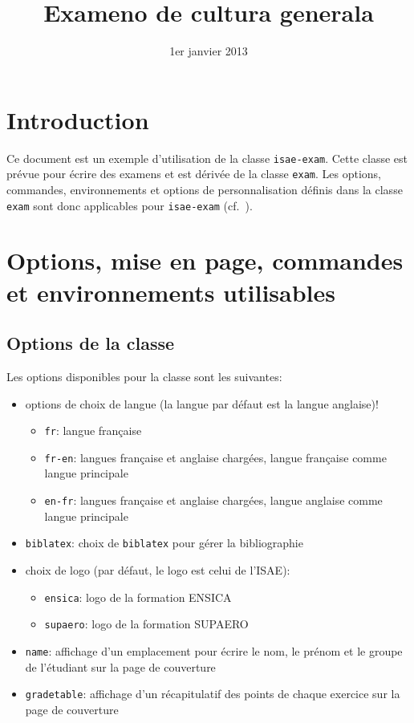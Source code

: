\documentclass[addpoints,fr,biblatex,name,gradetable,marksdetail,markssum]{isae-exam}
\title[Ex. de cultura generala]{Exameno de cultura generala}
\date{1er janvier 2013}
\begin{document}
\begin{coverpages}
  \basiccoverpage{}
\end{coverpages}

\section{Introduction}
\label{sec:introduction}

Ce document est un exemple d'utilisation de la classe
\texttt{isae-exam}. Cette classe est prévue pour écrire des examens et
est dérivée de la classe \texttt{exam}. Les options, commandes,
environnements et options de personnalisation définis dans la classe
\texttt{exam} sont donc applicables pour \texttt{isae-exam}
(cf.~\cite{hirschorn11:_exam}).

\section{Options, mise en page, commandes et environnements
  utilisables}
\label{sec:options-etc}

\subsection{Options de la classe}
\label{sec:options}

Les options disponibles pour la classe sont les suivantes:

\begin{itemize}
\item options de choix de langue (la langue par défaut est la langue
  anglaise)!
  \begin{itemize}
  \item \lstinline!fr!: langue française
  \item \lstinline!fr-en!: langues française et anglaise chargées,
    langue française comme langue principale
  \item \lstinline!en-fr!: langues française et anglaise chargées,
    langue anglaise comme langue principale
  \end{itemize}
\item \lstinline!biblatex!: choix de \texttt{biblatex} pour gérer la
  bibliographie
\item choix de logo (par défaut, le logo est celui de l'ISAE):
  \begin{itemize}
  \item \lstinline!ensica!: logo de la formation ENSICA
  \item \lstinline!supaero!: logo de la formation SUPAERO
  \end{itemize}
\item \lstinline!name!: affichage d'un emplacement pour écrire le nom,
  le prénom et le groupe de l'étudiant sur la page de couverture
\item \lstinline!gradetable!: affichage d'un récapitulatif des points
  de chaque exercice sur la page de couverture
\end{itemize}
\end{document}
